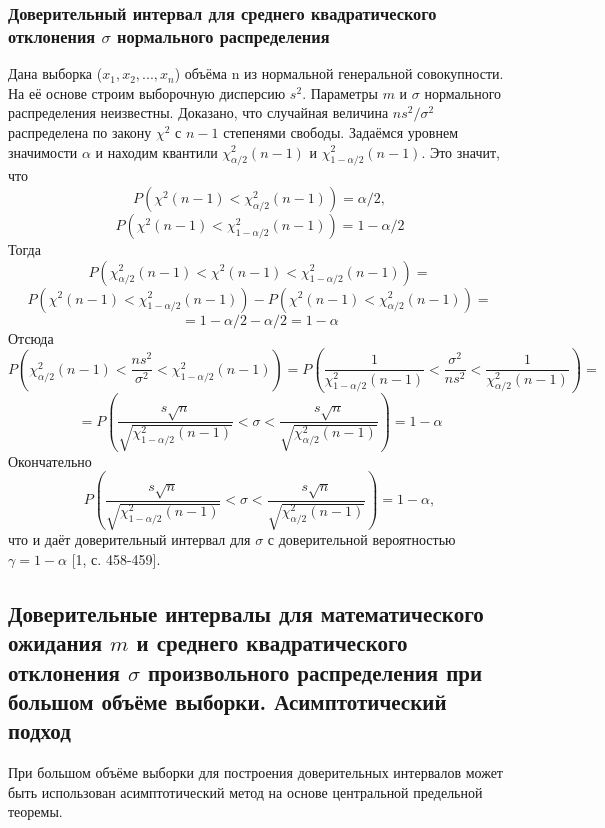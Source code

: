 \documentclass[a4paper]{article}
\begin{document}
    \subsubsection{Доверительный интервал для среднего квадратического отклонения $\sigma$ нормального распределения}
    Дана выборка ($x_{1},x_{2}, ... ,x_{n}$) объёма n из нормальной генеральной совокупности. На её основе строим выборочную дисперсию $s^{2}$. Параметры $m$ и $\sigma$ нормального распределения неизвестны. Доказано, что случайная величина $ns^{2}/\sigma^{2}$ распределена по закону $\chi^{2}$ с $n-1$ степенями свободы.
    \newline
    Задаёмся уровнем значимости $\alpha$ и находим квантили $\chi^{2}_{\alpha/2}(n-1)$ и $\chi^{2}_{1-\alpha/2}(n-1)$.
    \newline
    Это значит, что 
    $$  
    P\left(\chi^{2}(n-1) < \chi^{2}_{\alpha/2}(n-1)\right) = \alpha/2,
    $$
    $$
    P\left(\chi^{2}(n-1) < \chi^{2}_{1-\alpha/2}(n-1)\right) = 1-\alpha/2        
    $$
    Тогда
    $$
    P\left(\chi^{2}_{\alpha/2}(n-1) < \chi^{2}(n-1) < \chi^{2}_{1-\alpha/2}(n-1)\right) =
    $$
    $$
    P\left(\chi^{2}(n-1) < \chi^{2}_{1-\alpha/2}(n-1)\right) -P\left(\chi^{2}(n-1) < \chi^{2}_{\alpha/2}(n-1)\right) = 
    $$
    $$
    = 1 - \alpha/2 -\alpha/2 = 1 - \alpha
    $$
    Отсюда
    $$
    P\left(\chi^{2}_{\alpha/2}(n-1) < \frac{ns^{2}}{\sigma^{2}} < \chi^{2}_{1-\alpha/2}(n-1)\right) =
    P\left(\frac{1}{\chi^{2}_{1-\alpha/2}(n-1)} < \frac{\sigma^{2}}{ns^{2}} < \frac{1}{\chi^{2}_{\alpha/2}(n-1)} \right) = 
    $$
    $$
    = P\left(\frac{s\sqrt{n}}{\sqrt{\chi^{2}_{1-\alpha/2}(n-1)}} < \sigma <  \frac{s\sqrt{n}}{\sqrt{\chi^{2}_{\alpha/2}(n-1)}}\right) = 1- \alpha
    $$
    Окончательно
    \begin{equation}
         P\left(\frac{s\sqrt{n}}{\sqrt{\chi^{2}_{1-\alpha/2}(n-1)}} < \sigma <  \frac{s\sqrt{n}}{\sqrt{\chi^{2}_{\alpha/2}(n-1)}}\right) = 1- \alpha,
         \label{fin_interval}
    \end{equation}
    что и даёт доверительный интервал для $\sigma$ с доверительной вероятностью $\gamma = 1 - \alpha$ [1, с. 458-459].
    
    \subsection{Доверительные интервалы для математического ожидания $m$ и среднего квадратического отклонения $\sigma$ произвольного распределения при большом объёме выборки. Асимптотический подход}
    При большом объёме выборки для построения доверительных интервалов может быть использован асимптотический метод на основе центральной предельной теоремы.
\end{document}
